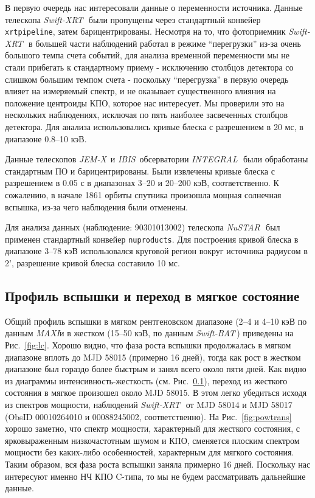 \documentclass{pazhb}
\def\maxi{{\em MAXI}}
\def\swiftx{{\em Swift-XRT\,}}
\def\swiftb{{\em Swift-BAT\,}}
\def\nustar{{\em NuSTAR\,}}
\def\integral{{\em INTEGRAL\,}}
\def\jemx{{\em JEM-X}}
\def\ibis{ {\em IBIS}}
\begin{document}
В первую очередь нас интересовали данные о переменности источника. Данные телескопа \swiftx\, были пропущены через стандартный конвейер \texttt{xrtpipeline}, затем барицентрированы. Несмотря на то, что фотоприемник \swiftx\, в большей части наблюдений работал в режиме ``перегрузки'' из-за очень большого темпа счета событий, для анализа временной переменности мы не стали прибегать к стандартному приему - исключению столбцов детектора со слишком большим темпом счета - поскольку ``перегрузка'' в первую очередь влияет на измеряемый спектр, и не оказывает существенного влияния на положение центроиды КПО, которое нас интересует. Мы проверили это на нескольких наблюдениях, исключая по пять наиболее засвеченных столбцов детектора. Для анализа использовались кривые блеска с разрешением в 20 мс, в диапазоне 0.8--10 кэВ.

Данные телескопов \jemx\, \citep{lund03} и \ibis\, \citep{ubertini03} обсерватории \integral\, были обработаны стандартным ПО и барицентрированы. Были извлечены кривые блеска с разрешением в 0.05 с в диапазонах 3--20 и 20--200 кэВ, соответственно. К сожалению, в начале 1861 орбиты спутника произошла мощная солнечная вспышка, из-за чего наблюдения были отменены.

Для анализа данных (наблюдение: 90301013002) телескопа \nustar\, был применен стандартный конвейер \texttt{nuproducts}. Для построения кривой блеска в диапазоне 3--78 кэВ использовался круговой регион вокруг источника радиусом в 2', разрешение кривой блеска составило 10 мс. 

\subsection{Профиль вспышки и переход в мягкое состояние}	

Общий профиль вспышки в мягком рентгеновском диапазоне (2--4 и 4--10 кэВ по данным \maxi и в жестком (15--50 кэВ, по данным \swiftb) приведены на Рис.~\ref{fig:lc}. Хорошо видно, что фаза роста вспышки продолжалась в мягком диапазоне вплоть до MJD 58015 (примерно 16 дней), тогда как рост в жестком диапазоне был гораздо более быстрым и занял всего около пяти дней. Как видно из диаграммы интенсивность-жесткость (см. Рис.~\ref{}), переход из жесткого состояния в мягкое произошел около MJD 58015. В этом легко убедиться исходя из спектров мощности, наблюдений \swiftx\, от MJD 58014 и MJD 58017 (ObsID 00010264010 и 00088245002, соответственно). На Рис.~\ref{fig:powtrans} хорошо заметно, что спектр мощности, характерный для жесткого состояния, с ярковыраженным низкочастотным шумом и КПО, сменяется плоским спектром мощности без каких-либо особенностей, характерным для мягкого состояния.
Таким образом, вся фаза роста вспышки заняла примерно 16 дней. Поскольку нас интересуют именно НЧ КПО C-типа, то мы не будем рассматривать дальнейшие данные.
\end{document}
